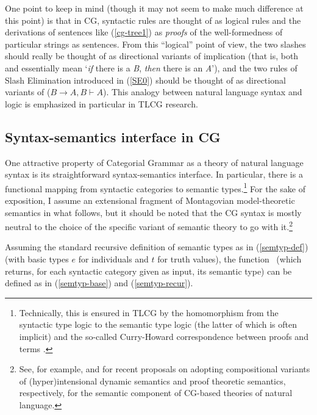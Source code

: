 \documentclass[output=paper
                ,modfonts
 	        ,biblatex
                ,babelshorthands
                ,newtxmath
                ,draftmode
                ,colorlinks, citecolor=brown
]{langscibook}
\begin{document}
One point to keep in mind (though it may not seem to make much
difference at this point) is that in CG, syntactic rules are
thought of as logical rules and the derivations of sentences like
(\ref{cg-tree1}) as \emph{proofs} of the well-formedness of
particular strings as sentences.
From this ``logical'' point of view, the two slashes should really be
thought of as directional variants of implication (that is, both
 and  essentially mean `\emph{if} there is a \textit{B},
\emph{then} there is an \textit{A}'), and the two rules of Slash Elimination
introduced in (\ref{SE0})
should be thought of as directional variants of 
($B \ensuremath{ \rightarrow } A, B  \ensuremath{\vdash\xspace } A$). This analogy between natural language
syntax and logic is emphasized in particular in TLCG research.


\subsection{Syntax-semantics interface in CG \label{interface}}

One attractive property of Categorial Grammar as a theory of natural language syntax
is its straightforward syntax-semantics
interface. In particular, there is a 
functional mapping from syntactic categories to semantic
types.\footnote{Technically, this is ensured in TLCG by the 
homomorphism from the syntactic type logic to the semantic type logic
(the latter of which is often implicit) and the so-called Curry-Howard
correspondence between proofs and terms \citep{vanBenthem88}.}
For the sake of exposition, I assume an extensional fragment of
Montagovian model-theoretic semantics in what follows, but it should be noted that the
CG syntax is mostly neutral to the choice of the specific variant of
semantic theory to go with it.\footnote{See,  for example,  \citet{martin2013} and
\citet{bekkimineshima17} for recent proposals on adopting compositional variants
of (hyper)intensional dynamic semantics and proof theoretic semantics,
respectively, for the semantic component of CG-based theories of
natural language.}

Assuming the standard recursive definition of semantic types
as in (\ref{semtyp-def}) (with basic types $e$ for
individuals and $t$ for truth values), the function \SemTyp\ (which returns, for each
syntactic category given as input, its semantic type) can be defined as in
(\ref{semtyp-base}) and (\ref{semtyp-recur}).
\end{document}
